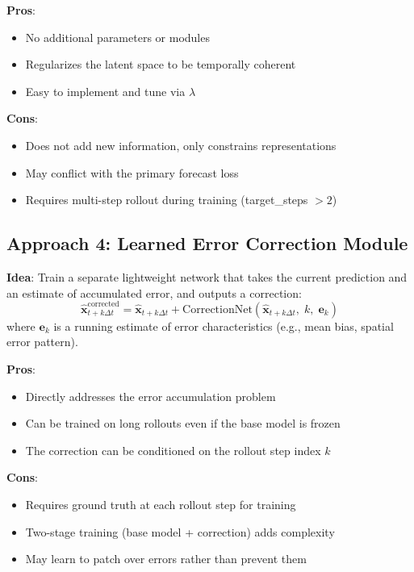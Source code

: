 \documentclass[11pt,a4paper]{article}
\begin{document}
\textbf{Pros}:
\begin{itemize}[nosep]
  \item No additional parameters or modules
  \item Regularizes the latent space to be temporally coherent
  \item Easy to implement and tune via $\lambda$
\end{itemize}

\textbf{Cons}:
\begin{itemize}[nosep]
  \item Does not add new information, only constrains representations
  \item May conflict with the primary forecast loss
  \item Requires multi-step rollout during training (target\_steps $> 2$)
\end{itemize}

\subsection{Approach 4: Learned Error Correction Module}

\textbf{Idea}: Train a separate lightweight network that takes the current prediction and an estimate of accumulated error, and outputs a correction:
\[
\hat{\mathbf{x}}_{t+k\Delta t}^\text{corrected} = \hat{\mathbf{x}}_{t+k\Delta t} + \text{CorrectionNet}(\hat{\mathbf{x}}_{t+k\Delta t}, \; k, \; \mathbf{e}_k)
\]
where $\mathbf{e}_k$ is a running estimate of error characteristics (e.g., mean bias, spatial error pattern).

\textbf{Pros}:
\begin{itemize}[nosep]
  \item Directly addresses the error accumulation problem
  \item Can be trained on long rollouts even if the base model is frozen
  \item The correction can be conditioned on the rollout step index $k$
\end{itemize}

\textbf{Cons}:
\begin{itemize}[nosep]
  \item Requires ground truth at each rollout step for training
  \item Two-stage training (base model + correction) adds complexity
  \item May learn to patch over errors rather than prevent them
\end{itemize}
\end{document}

